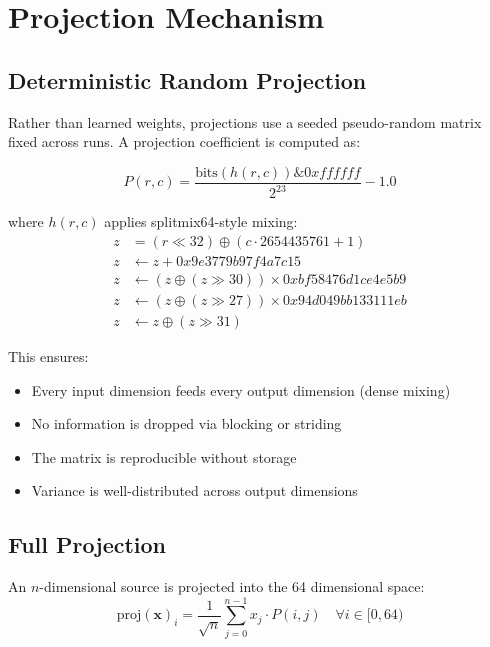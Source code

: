 \documentclass[12pt]{article}
\begin{document}
\section{Projection Mechanism}

\subsection{Deterministic Random Projection}

Rather than learned weights, projections use a seeded pseudo-random
matrix fixed across runs. A projection coefficient is computed as:

\begin{equation}
P(r, c) = \frac{\text{bits}(h(r, c)) \& 0xffffff}{2^{23}} - 1.0
\end{equation}

where $h(r, c)$ applies splitmix64-style mixing:
\begin{align}
z &= (r \ll 32) \oplus (c \cdot 2654435761 + 1) \\
z &\leftarrow z + 0x9e3779b97f4a7c15 \\
z &\leftarrow (z \oplus (z \gg 30)) \times 0xbf58476d1ce4e5b9 \\
z &\leftarrow (z \oplus (z \gg 27)) \times 0x94d049bb133111eb \\
z &\leftarrow z \oplus (z \gg 31)
\end{align}

This ensures:
\begin{itemize}
\item Every input dimension feeds every output dimension (dense mixing)
\item No information is dropped via blocking or striding
\item The matrix is reproducible without storage
\item Variance is well-distributed across output dimensions
\end{itemize}

\subsection{Full Projection}

An $n$-dimensional source is projected into the 64 dimensional space:
\begin{equation}
\text{proj}(\mathbf{x})_i = \frac{1}{\sqrt{n}} \sum_{j=0}^{n-1}
x_j \cdot P(i, j)
\quad \forall i \in [0, 64)
\end{equation}
\end{document}
